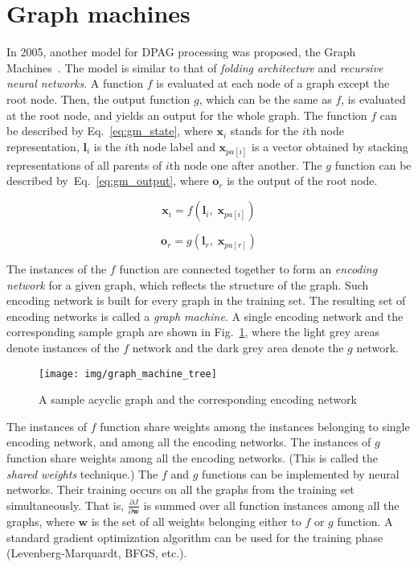 \section{Graph machines}
In 2005, another model for DPAG processing was proposed, the Graph Machines~\cite{goulon2005learning}. The model is similar to that of \emph{folding architecture} and \emph{recursive neural networks}. A function $f$ is evaluated at each node of a graph except the root node. Then, the output function $g$, which can be the same as $f$, is evaluated at the root node, and yields an output for the whole graph. The function $f$ can be described by Eq.~\ref{eq:gm_state}, where $\bm{x}_i$ stands for the $i$th node representation, $\bm{l}_i$ is the $i$th node label and $\bm{x}_{pa[i]}$ is a vector obtained by stacking representations of all parents of $i$th node one after another. The $g$ function can be described by~Eq.~\ref{eq:gm_output}, where $\bm{o}_r$ is the output of the root node.

\begin{equation}
\bm{x}_i = f(\bm{l}_i, \; \bm{x}_{pa[i]})
\label{eq:gm_state}
\end{equation}

\begin{equation}
\bm{o}_r = g(\bm{l}_r, \; \bm{x}_{pa[r]})
\label{eq:gm_output}
\end{equation}

The instances of the $f$ function are connected together to form an \emph{encoding network} for a given graph, which reflects the structure of the graph. Such encoding network is built for every graph in the training set. The resulting set of encoding networks is called a \emph{graph machine}. A single encoding network and the corresponding sample graph are shown in Fig.~\ref{fig:graph_machine_tree}, where the light grey areas denote instances of the $f$ network and the dark grey area denote the $g$ network.

\begin{figure}[h!]
\begin{center}
	\texttt{[image: img/graph\_machine\_tree]}
	\caption{A sample acyclic graph and the corresponding encoding network}
	\label{fig:graph_machine_tree}
\end{center}
\end{figure}

The instances of $f$ function share weights among the instances belonging to single encoding network, and among all the encoding networks. The instances of $g$ function share weights among all the encoding networks. (This is called the \emph{shared weights} technique.) The $f$ and $g$ functions can be implemented by neural networks. Their training occurs on all the graphs from the training set simultaneously. That is, $\frac{\partial J}{\partial \bm{w}}$ is summed over all function instances among all the graphs, where $\bm{w}$ is the set of all weights belonging either to $f$ or $g$ function. A standard gradient optimization algorithm can be used for the training phase (Levenberg-Marquardt, BFGS, etc.).

